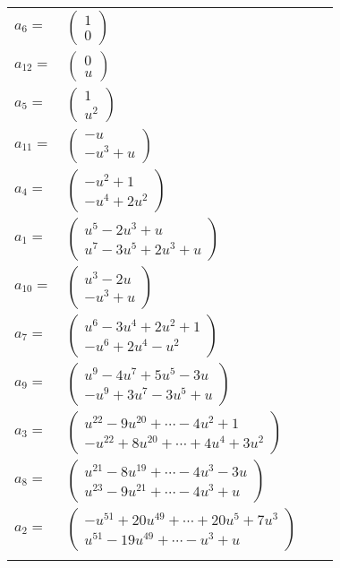 \documentclass[1p]{elsarticle_modified}
\theoremstyle{definition}
\begin{document}
\begin{tabular}{m{7pt} m{180pt} m{7pt} m{180pt} }
\flushright $a_{6}=$&$\begin{pmatrix}1\\0\end{pmatrix}$ \\
\flushright $a_{12}=$&$\begin{pmatrix}0\\u\end{pmatrix}$ \\
\flushright $a_{5}=$&$\begin{pmatrix}1\\u^2\end{pmatrix}$ \\
\flushright $a_{11}=$&$\begin{pmatrix}- u\\- u^3+u\end{pmatrix}$ \\
\flushright $a_{4}=$&$\begin{pmatrix}- u^2+1\\- u^4+2 u^2\end{pmatrix}$ \\
\flushright $a_{1}=$&$\begin{pmatrix}u^5-2 u^3+u\\u^7-3 u^5+2 u^3+u\end{pmatrix}$ \\
\flushright $a_{10}=$&$\begin{pmatrix}u^3-2 u\\- u^3+u\end{pmatrix}$ \\
\flushright $a_{7}=$&$\begin{pmatrix}u^6-3 u^4+2 u^2+1\\- u^6+2 u^4- u^2\end{pmatrix}$ \\
\flushright $a_{9}=$&$\begin{pmatrix}u^9-4 u^7+5 u^5-3 u\\- u^9+3 u^7-3 u^5+u\end{pmatrix}$ \\
\flushright $a_{3}=$&$\begin{pmatrix}u^{22}-9 u^{20}+\cdots-4 u^2+1\\- u^{22}+8 u^{20}+\cdots+4 u^4+3 u^2\end{pmatrix}$ \\
\flushright $a_{8}=$&$\begin{pmatrix}u^{21}-8 u^{19}+\cdots-4 u^3-3 u\\u^{23}-9 u^{21}+\cdots-4 u^3+u\end{pmatrix}$ \\
\flushright $a_{2}=$&$\begin{pmatrix}- u^{51}+20 u^{49}+\cdots+20 u^5+7 u^3\\u^{51}-19 u^{49}+\cdots- u^3+u\end{pmatrix}$\\&\end{tabular}
\end{document}
